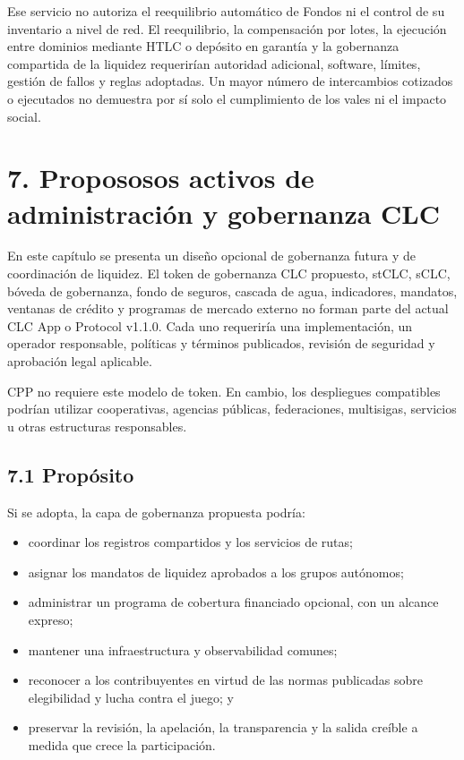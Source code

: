 \documentclass[11pt]{article}
\begin{document}
Ese servicio no autoriza el reequilibrio automático de Fondos ni el control de su inventario a nivel de red. El reequilibrio, la compensación por lotes, la ejecución entre dominios mediante HTLC o depósito en garantía y la gobernanza compartida de la liquidez requerirían autoridad adicional, software, límites, gestión de fallos y reglas adoptadas. Un mayor número de intercambios cotizados o ejecutados no demuestra por sí solo el cumplimiento de los vales ni el impacto social.


\section*{7. Propososos activos de administración y gobernanza CLC}

En este capítulo se presenta un diseño opcional de gobernanza futura y de coordinación de liquidez. El token de gobernanza CLC propuesto, stCLC, sCLC, bóveda de gobernanza, fondo de seguros, cascada de agua, indicadores, mandatos, ventanas de crédito y programas de mercado externo no forman parte del actual CLC App o Protocol v1.1.0. Cada uno requeriría una implementación, un operador responsable, políticas y términos publicados, revisión de seguridad y aprobación legal aplicable.

CPP no requiere este modelo de token. En cambio, los despliegues compatibles podrían utilizar cooperativas, agencias públicas, federaciones, multisigas, servicios u otras estructuras responsables.

\subsection*{7.1 Propósito}

Si se adopta, la capa de gobernanza propuesta podría:

\begin{itemize}[leftmargin=*]
\item coordinar los registros compartidos y los servicios de rutas;
\item asignar los mandatos de liquidez aprobados a los grupos autónomos;
\item administrar un programa de cobertura financiado opcional, con un alcance expreso;
\item mantener una infraestructura y observabilidad comunes;
\item reconocer a los contribuyentes en virtud de las normas publicadas sobre elegibilidad y lucha contra el juego; y
\item preservar la revisión, la apelación, la transparencia y la salida creíble a medida que crece la participación.
\end{itemize}
\end{document}
